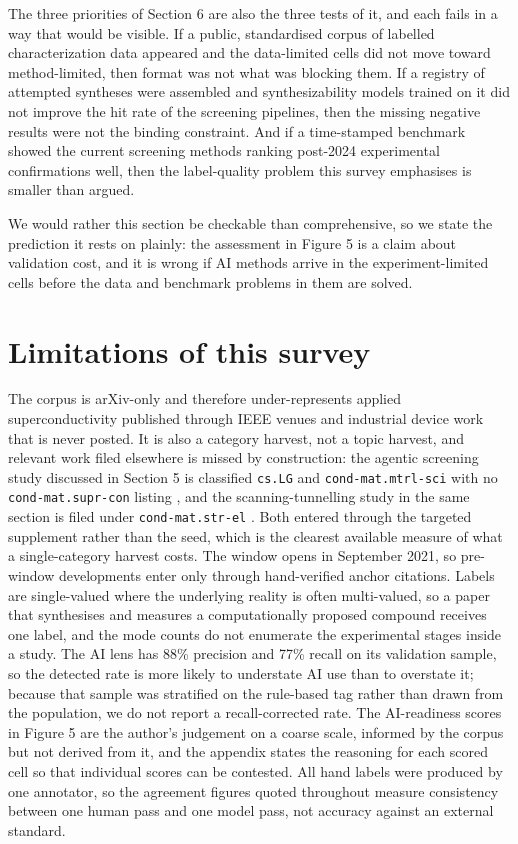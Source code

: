 \documentclass[
  11pt,
]{article}
\begin{document}
The three priorities of Section 6 are also the three tests of it, and
each fails in a way that would be visible. If a public, standardised
corpus of labelled characterization data appeared and the data-limited
cells did not move toward method-limited, then format was not what was
blocking them. If a registry of attempted syntheses were assembled and
synthesizability models trained on it did not improve the hit rate of
the screening pipelines, then the missing negative results were not the
binding constraint. And if a time-stamped benchmark showed the current
screening methods ranking post-2024 experimental confirmations well,
then the label-quality problem this survey emphasises is smaller than
argued.

We would rather this section be checkable than comprehensive, so we
state the prediction it rests on plainly: the assessment in Figure 5 is
a claim about validation cost, and it is wrong if AI methods arrive in
the experiment-limited cells before the data and benchmark problems in
them are solved.

\section{Limitations of this
survey}\label{limitations-of-this-survey}

The corpus is arXiv-only and therefore under-represents applied
superconductivity published through IEEE venues and industrial device
work that is never posted. It is also a category harvest, not a topic
harvest, and relevant work filed elsewhere is missed by construction:
the agentic screening study discussed in Section 5 is classified
\texttt{cs.LG} and \texttt{cond-mat.mtrl-sci} with no
\texttt{cond-mat.supr-con} listing \citep{li2026agentic}, and the
scanning-tunnelling study in the same section is filed under
\texttt{cond-mat.str-el} \citep{taranto2022unsupervised}. Both entered
through the targeted supplement rather than the seed, which is the
clearest available measure of what a single-category harvest costs. The
window opens in September 2021, so pre-window developments enter only
through hand-verified anchor citations. Labels are single-valued where
the underlying reality is often multi-valued, so a paper that
synthesises and measures a computationally proposed compound receives
one label, and the mode counts do not enumerate the experimental stages
inside a study. The AI lens has 88\% precision and 77\% recall on its
validation sample, so the detected rate is more likely to understate AI
use than to overstate it; because that sample was stratified on the
rule-based tag rather than drawn from the population, we do not report a
recall-corrected rate. The AI-readiness scores in Figure 5 are the
author's judgement on a coarse scale, informed by the corpus but not
derived from it, and the appendix states the reasoning for each scored
cell so that individual scores can be contested. All hand labels were
produced by one annotator, so the agreement figures quoted throughout
measure consistency between one human pass and one model pass, not
accuracy against an external standard.
\end{document}
